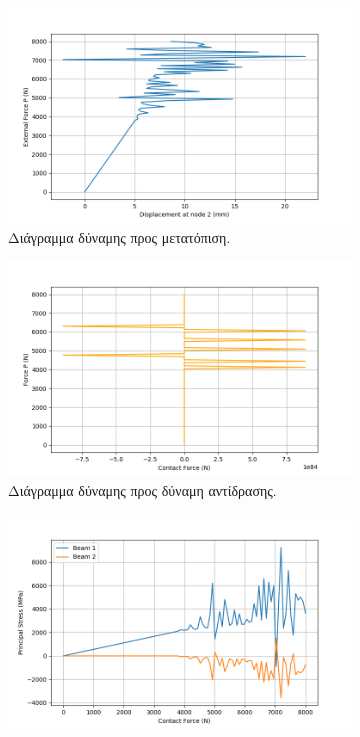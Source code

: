 \documentclass{article}
\begin{document}
\begin{figure}[H]
    \centering
    \begin{subfigure}{0.3\linewidth}
        \centering
        \includegraphics[width=\linewidth]{media/apotyxia1.png}
        \caption{Διάγραμμα δύναμης προς μετατόπιση.}
    \end{subfigure}
    \hfill
    \begin{subfigure}{0.3\linewidth}
        \centering
        \includegraphics[width= \linewidth]{media/apotyxia22.png}
        \caption{Διάγραμμα δύναμης προς δύναμη αντίδρασης.}
    \end{subfigure}
    \hfill
    \begin{subfigure}{0.3\linewidth}
        \centering
        \includegraphics[width=\linewidth]{media/apotyxia3.png}

\end{subfigure}
\end{figure}
\end{document}
